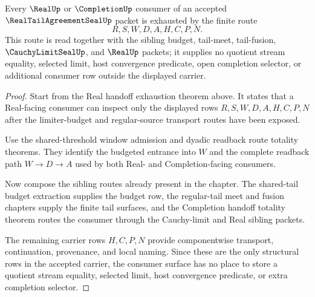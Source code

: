 \begin{theorem}
\label{thm:real-tail-agreement-seal-real-completion-consumer-exhaustion}
Every $\RealUp$ or $\CompletionUp$ consumer of an accepted $\RealTailAgreementSealUp$ packet is exhausted by the finite route
$$
R,S,W,D,A,H,C,P,N.
$$
This route is read together with the sibling budget, tail-meet, tail-fusion, $\CauchyLimitSealUp$, and $\RealUp$ packets; it supplies no quotient stream equality, selected limit, host convergence predicate, open completion selector, or additional consumer row outside the displayed carrier.
\end{theorem}
\begin{proof}
Start from the Real handoff exhaustion theorem above. It states that a Real-facing consumer can inspect only the displayed rows $R,S,W,D,A,H,C,P,N$ after the limiter-budget and regular-source transport routes have been exposed.

Use the shared-threshold window admission and dyadic readback route totality theorems. They identify the budgeted entrance into $W$ and the complete readback path $W \to D \to A$ used by both Real- and Completion-facing consumers.

Now compose the sibling routes already present in the chapter. The shared-tail budget extraction supplies the budget row, the regular-tail meet and fusion chapters supply the finite tail surfaces, and the Completion handoff totality theorem routes the consumer through the Cauchy-limit and Real sibling packets.

The remaining carrier rows $H,C,P,N$ provide componentwise transport, continuation, provenance, and local naming. Since these are the only structural rows in the accepted carrier, the consumer surface has no place to store a quotient stream equality, selected limit, host convergence predicate, or extra completion selector.
\end{proof}

